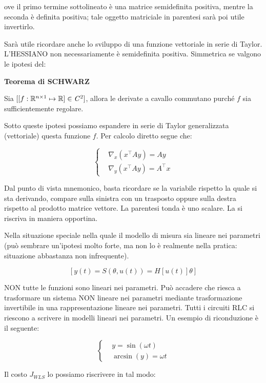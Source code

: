 ove il primo termine sottolineato è una matrice semidefinita positiva, mentre la seconda è definita positiva; tale oggetto matriciale in parentesi sarà poi utile invertirlo. 

Sarà utile ricordare anche lo sviluppo di una funzione vettoriale in serie di Taylor. L'HESSIANO non necessariamente è semidefinita positiva. Simmetrica se valgono le ipotesi del:

\begin{thrm}{\textbf{Teorema di SCHWARZ}}

Sia $[[f:\mathbb{R}^{n\times 1}\mapsto \mathbb{R}]\in\mathit{C}^2]$, allora le derivate a cavallo commutano purché $f$ sia sufficientemente regolare.

\end{thrm}

Sotto queste ipotesi possiamo espandere in serie di Taylor generalizzata (vettoriale) questa funzione $f$. Per calcolo diretto segue che:

\[
	\left\{
	\begin{aligned}
	&\nabla_x{(x^\top Ay)} = Ay\\
	&\nabla_y{(x^\top Ay)} = A^\top x
	\end{aligned}
	\right.
\]

Dal punto di vista mnemonico, basta ricordare se la variabile rispetto la quale si sta derivando, compare sulla sinistra con un trasposto oppure sulla destra rispetto al prodotto matrice vettore. La parentesi tonda è uno scalare. La si riscriva in maniera opportina.

Nella situazione speciale nella quale il modello di misura sia lineare nei parametri (può sembrare un'ipotesi molto forte, ma non lo è realmente nella pratica: situazione abbastanza non infrequente).

\[
	[y(t) = S(\theta,u(t)) = H[u(t)]\theta]
\]

NON tutte le funzioni sono lineari nei parametri. Può accadere che riesca a trasformare un sistema NON lineare nei parametri mediante trasformazione invertibile in una rappresentazione lineare nei parametri. Tutti i circuiti RLC si riescono a scrivere in modelli lineari nei parametri. Un esempio di riconduzione è il seguente:

\[
	\left\{
	\begin{aligned}
	&y=\sin(\omega t)\\
	&\arcsin(y)=\omega t
	\end{aligned}
	\right.
\]

Il costo $J_{WLS}$ lo possiamo riscrivere in tal modo:

